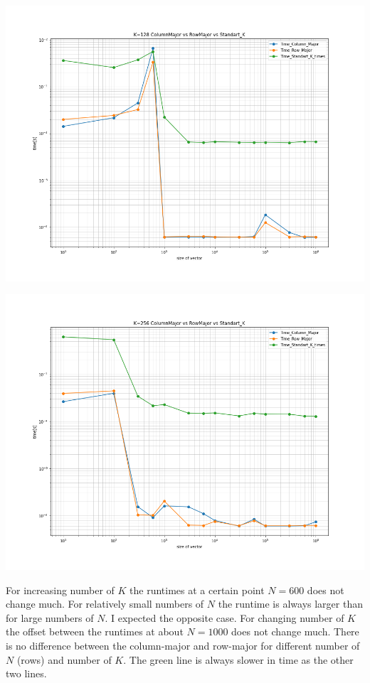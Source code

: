 \documentclass[11pt,a4paper]{article}
\begin{document}
\begin{center}
	
	\begin{minipage}[t]{0.49\textwidth}
		\includegraphics[width=\textwidth]{Bilder/K=128_ColumnMajor_vs_RowMajor_vs_Standart_K.png}
	\end{minipage}
	\begin{minipage}[t]{0.49\textwidth}
		\includegraphics[width=\textwidth]{Bilder/K=256_ColumnMajor_vs_RowMajor_vs_Standart_K.png}
	\end{minipage}
	
\end{center}
\noindent
For increasing number of $K$ the runtimes at a certain point $N = 600$ does not change much. For relatively small numbers of $N$ the runtime is always larger than for large numbers of $N$. I expected the opposite case. For changing number of $K$ the offset between the runtimes at about $N = 1000$ does not change much. There is no difference between the column-major and row-major for different number of $N$ (rows) and number of $K$. The green line is always slower in time as the other two lines.\\\\
\end{document}
